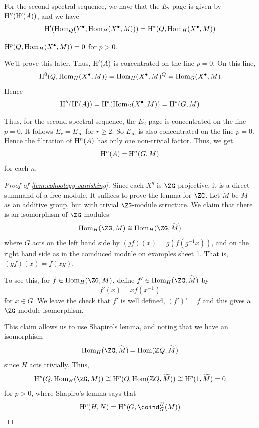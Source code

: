 \documentclass{article}
\begin{document}
For the second spectral sequence, we have that the \(E_2\)-page is given by \(\mathrm{H}''(\mathrm{H}'(A))\), and we have
\[\mathrm{H}'(\operatorname{Hom}_Q(Y^\bullet, \operatorname{Hom}_H(X^\bullet, M)))= \mathrm{H}^*(Q, \operatorname{Hom}_H(X^\bullet, M))\]

\begin{lemma}
    \label{lem:cohoology-vanishing}
    \(\mathrm{H}^p(Q, \operatorname{Hom}_H(X^\bullet, M)) = 0\) for \(p > 0\).
\end{lemma}

We'll prove this later. Thus, \(\mathrm{H}'(A)\) is concentrated on the line \(p = 0\). On this line,
\[\mathrm{H}^0(Q, \operatorname{Hom}_H(X^\bullet, M)) = \operatorname{Hom}_H(X^\bullet, M)^Q = \operatorname{Hom}_G(X^\bullet, M)\]
Hence
\[\mathrm{H}''(\mathrm{H}'(A)) = \mathrm{H}^*(\operatorname{Hom}_G(X^\bullet, M)) = \mathrm{H}^*(G, M)\]

Thus, for the second spectral sequence, the \(E_2\)-page is concentrated on the line \(p = 0\). It follows \(E_r = E_\infty\) for \(r \ge 2\). So \(E_\infty\) is also concentrated on the line \(p = 0\). Hence the filtration of \(\mathrm{H}^n(A)\) has only one non-trivial factor. Thus, we get
\[\mathrm{H}^n(A) = \mathrm{H}^n(G, M)\]
for each \(n\).

\lec

\begin{proof}
    [Proof of \cref{lem:cohoology-vanishing}]
    Since each \(X^q\) is \(\ZG\)-projective, it is a direct summand of a free module. It suffices to prove the lemma for \(\ZG\). Let \(\widetilde M\) be \(M\) as an additive group, but with trivial \(\ZG\)-module structure. We claim that there is an isomorphism of \(\ZG\)-modules
    \[\Hom_H(\ZG, M) \cong \Hom_H(\ZG, \widetilde M)\]
    where \(G\) acts on the left hand side by \((gf)(x) = g(f(g^{-1}x))\), and on the right hand side as in the coinduced module on examples sheet 1. That is, \((gf)(x) = f(xg)\).

    To see this, for \(f \in \Hom_H(\ZG, M)\), define \(f' \in \Hom_H(\ZG, \widetilde M)\) by
    \[f'(x) = xf(x^{-1})\]
    for \(x \in G\). We leave the check that \(f'\) is well defined, \((f')' = f\) and this gives a \(\ZG\)-module isomorphism.

    This claim allows us to use Shapiro's lemma, and noting that we have an isomorphism
    \[\Hom_H(\ZG, \widetilde M) = \Hom(\Z Q, \widetilde M)\]
    since \(H\) acts trivially. Thus,
    \[\HH^p(Q, \Hom_H(\ZG, M)) \cong \HH^p(Q, \Hom(\Z Q, \widetilde M)) \cong \HH^p(1, \widetilde M) = 0\]
    for \(p > 0\), where Shapiro's lemma says that
    \[\HH^p(H, N) = \HH^p(G, \coind_G^H(M))\]
\end{proof}
\end{document}
